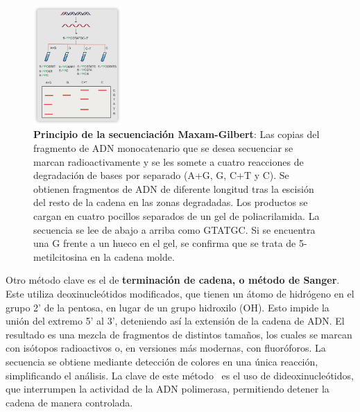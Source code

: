 \begin{figure}[htbp]
\centering
\includegraphics[width = 0.3\textwidth]{figs/maxam-gilbert.png}
\caption{\textbf{Principio de la secuenciación Maxam-Gilbert}: Las copias del fragmento de ADN monocatenario que se desea secuenciar se marcan radioactivamente y se les somete a cuatro reacciones de degradación de bases por separado (A+G, G, C+T y C). Se obtienen fragmentos de ADN de diferente longitud tras la escisión del resto de la cadena en las zonas degradadas. Los productos se cargan en cuatro pocillos separados de un gel de poliacrilamida. La secuencia se lee de abajo a arriba como GTATGC. Si se encuentra una G frente a un hueco en el gel, se confirma que se trata de 5-metilcitosina en la cadena molde.}
\end{figure}

Otro método clave es el de \textbf{terminación de cadena, o método de Sanger}. Este utiliza deoxinucleótidos modificados, que tienen un átomo de hidrógeno en el grupo 2' de la pentosa, en lugar de un grupo hidroxilo (OH). Esto impide la unión del extremo 5' al 3', deteniendo así la extensión de la cadena de ADN. El resultado es una mezcla de fragmentos de distintos tamaños, los cuales se marcan con isótopos radioactivos o, en versiones más modernas, con fluoróforos. La secuencia se obtiene mediante detección de colores en una única reacción, simplificando el análisis. La clave de este método  \ es el uso de dideoxinucleótidos, que interrumpen la actividad de la ADN polimerasa, permitiendo detener la cadena de manera controlada.

